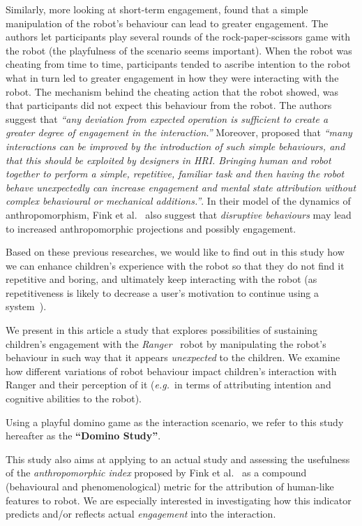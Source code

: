 \documentclass{sig-alternate}
\newcommand{\eg}{{\textit{e.g.~}}}
\begin{document}
Similarly, more looking at short-term engagement, \cite{short_no_2010} found
that a simple manipulation of the robot's behaviour can lead to greater
engagement. The authors let participants play several rounds of the
rock-paper-scissors game with the robot (the playfulness of the scenario seems
important). When the robot was cheating from time to time, participants tended
to ascribe intention to the robot what in turn led to greater engagement in how
they were interacting with the robot. The mechanism behind the cheating action
that the robot showed, was that participants did not expect this behaviour from
the robot. The authors suggest that \textit{``any deviation from expected
    operation is sufficient to create a greater degree of engagement in the
interaction.''} Moreover, \cite[p.~225]{short_no_2010} proposed that
\textit{``many interactions can be improved by the introduction of such simple
    behaviours, and that this should be exploited by designers in HRI. Bringing
    human and robot together to perform a simple, repetitive, familiar task and
then having the robot behave unexpectedly can increase engagement and mental
state attribution without complex behavioural or mechanical additions.''}.
In their model of the dynamics of anthropomorphism, Fink et
al.~\cite{fink2014dynamics} also suggest that \emph{disruptive behaviours}
may lead to increased anthropomorphic projections and possibly engagement.

Based on these previous researches, we would like to find out in this study how
we can enhance children's experience with the robot so that they do not find it
repetitive and boring, and ultimately keep interacting with the robot (as
repetitiveness is likely to decrease a user's motivation to continue using a
system~\cite{bickmore_establishing_2005}).

We present in this article a study that explores possibilities of sustaining
children's engagement with the \emph{Ranger}~\cite{mondada2014ranger} robot by
manipulating the robot's behaviour in such way that it appears
\textit{unexpected} to the children. We examine how different variations of
robot behaviour impact children's interaction with Ranger and their perception of
it (\eg in terms of attributing intention and cognitive abilities to the robot).

Using a playful domino game as the interaction scenario, we refer to this study
hereafter as the \textbf{``Domino Study''}.

This study also aims at applying to an actual study and assessing the usefulness
of the \emph{anthropomorphic index} proposed by Fink et
al.~\cite{fink2014dynamics} as a compound (behavioural and phenomenological)
metric for the attribution of human-like features to robot. We are especially
interested in investigating how this indicator predicts and/or reflects actual
\emph{engagement} into the interaction.
\end{document}
